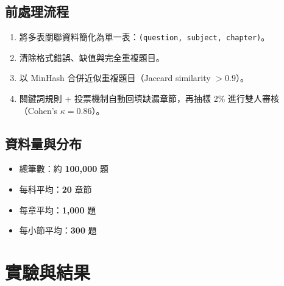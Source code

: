 \documentclass[10pt]{article}
\begin{document}
\begin{CJK}{UTF8}{bsmi}
\subsection{前處理流程}
\begin{enumerate}[nosep]
  \item 將多表關聯資料簡化為單一表：\texttt{(question, subject, chapter)}。
  \item 清除格式錯誤、缺值與完全重複題目。
  \item 以 MinHash 合併近似重複題目（Jaccard similarity $>0.9$）。
  \item 關鍵詞規則 + 投票機制自動回填缺漏章節，再抽樣 2\% 進行雙人審核（Cohen’s $\kappa=0.86$）。
\end{enumerate}

\subsection{資料量與分布}
\begin{itemize}[nosep]
  \item 總筆數：約 \textbf{100,000} 題
  \item 每科平均：\textbf{20} 章節
  \item 每章平均：\textbf{1,000} 題
  \item 每小節平均：\textbf{300} 題
\end{itemize}

\section{實驗與結果}


\end{CJK}
\end{document}
